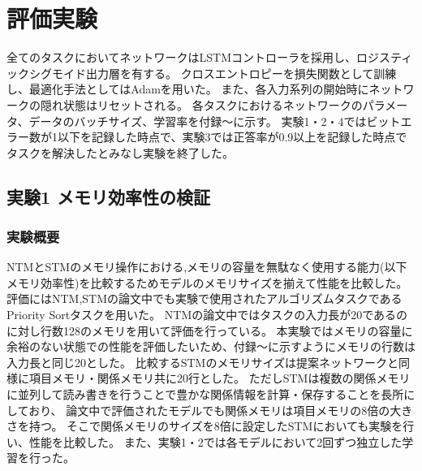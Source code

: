 \chapter{評価実験}\label{chap:evaluation}
全てのタスクにおいてネットワークはLSTMコントローラを採用し、ロジスティックシグモイド出力層を有する。
クロスエントロピーを損失関数として訓練し、最適化手法としてはAdamを用いた。
また、各入力系列の開始時にネットワークの隠れ状態はリセットされる。
各タスクにおけるネットワークのパラメータ、データのバッチサイズ、学習率を付録〜に示す。
実験1・2・4ではビットエラー数が1以下を記録した時点で、実験3では正答率が0.9以上を記録した時点でタスクを解決したとみなし実験を終了した。

\section{実験1 メモリ効率性の検証}
\subsection{実験概要}
NTMとSTMのメモリ操作における,メモリの容量を無駄なく使用する能力(以下メモリ効率性)を比較するためモデルのメモリサイズを揃えて性能を比較した。
評価にはNTM,STMの論文中でも実験で使用されたアルゴリズムタスクであるPriority Sortタスクを用いた。
NTMの論文中ではタスクの入力長が20であるのに対し行数128のメモリを用いて評価を行っている。
本実験ではメモリの容量に余裕のない状態での性能を評価したいため、付録〜に示すようにメモリの行数は入力長と同じ20とした。
比較するSTMのメモリサイズは提案ネットワークと同様に項目メモリ・関係メモリ共に20行とした。
ただしSTMは複数の関係メモリに並列して読み書きを行うことで豊かな関係情報を計算・保存することを長所にしており、
論文中で評価されたモデルでも関係メモリは項目メモリの8倍の大きさを持つ。
そこで関係メモリのサイズを8倍に設定したSTMにおいても実験を行い、性能を比較した。
また、実験1・2では各モデルにおいて2回ずつ独立した学習を行った。

